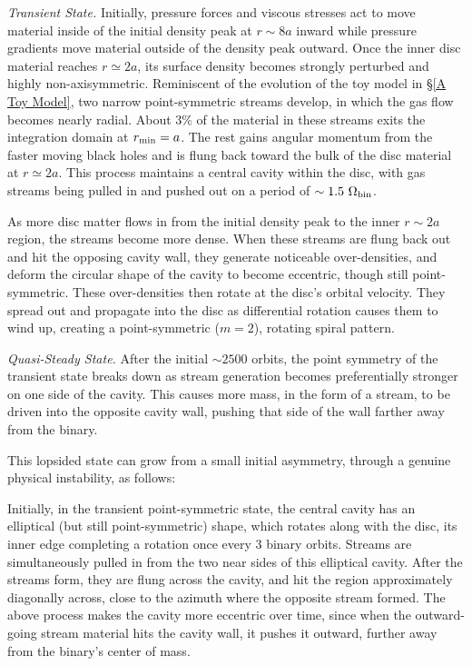 {\em Transient State.}  Initially, pressure forces and viscous
stresses act to move material inside of the initial density peak at
$r\sim 8a$ inward while pressure gradients move material outside of
the density peak outward.  Once the inner disc material reaches
$r\simeq 2a$, its surface density becomes strongly perturbed and
highly non-axisymmetric.  Reminiscent of the evolution of the toy
model in \S \ref{A Toy Model}, two narrow point-symmetric streams
develop, in which the gas flow becomes nearly radial.  About 3$\%$ of
the material in these streams exits the integration domain at
$r_{\rm{min}}=a$. The rest gains angular momentum from the faster
moving black holes and is flung back toward the bulk of the disc
material at $r\simeq 2a$.  This process maintains a central cavity
within the disc, with gas streams being pulled in and pushed out on a
period of $\sim1.5 \hbox{ } \Omega_{\rm{bin}}$. 


As more disc matter flows in from the initial density peak to the
inner $r\sim 2a$ region, the streams become more dense. When these
streams are flung back out and hit the opposing cavity wall, they
generate noticeable over-densities, and deform the circular shape of
the cavity to become eccentric, though still point-symmetric.  These over-densities then
rotate at the disc's orbital velocity.  They spread out and propagate
into the disc as differential rotation causes them to wind up,
creating a point-symmetric ($m=2$), rotating spiral pattern.

  
{\em Quasi-Steady State.}  After the initial $\sim2500$ orbits, 
the point symmetry of the transient state breaks down as stream generation
becomes preferentially stronger on one side of the cavity. This causes 
more mass, in the form of a stream, to be driven into the opposite cavity wall, 
pushing that side of the wall farther away from the binary.  


This lopsided state can grow from a small initial asymmetry, through
a genuine physical instability, as follows:

Initially, in the transient point-symmetric state, the central cavity
has an elliptical (but still point-symmetric) shape, which rotates
along with the disc, its inner edge completing a rotation once every 3 binary
orbits. Streams are simultaneously pulled in from the two near sides
of this elliptical cavity. After the streams form, they are flung
across the cavity, and hit the region approximately diagonally across,
close to the azimuth where the opposite stream formed.  The above
process makes the cavity more eccentric over time, since when the
outward-going stream material hits the cavity wall, it pushes it
outward, further away from the binary's center of mass.


